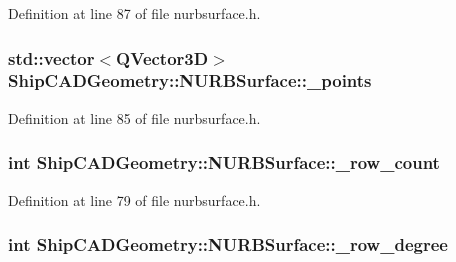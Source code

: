 Definition at line 87 of file nurbsurface.\-h.

\hypertarget{classShipCADGeometry_1_1NURBSurface_ae040c228e863bedf30c7e70a94a87c27}{
\subsubsection[{\-\_\-points}]{\setlength{\rightskip}{0pt plus 5cm}std\-::vector$<$Q\-Vector3\-D$>$ Ship\-C\-A\-D\-Geometry\-::\-N\-U\-R\-B\-Surface\-::\-\_\-points\hspace{0.3cm}{\ttfamily [protected]}}}\label{classShipCADGeometry_1_1NURBSurface_ae040c228e863bedf30c7e70a94a87c27}


Definition at line 85 of file nurbsurface.\-h.

\hypertarget{classShipCADGeometry_1_1NURBSurface_a88c1ca0b8176d2c0a758afa936d8eaba}{
\subsubsection[{\-\_\-row\-\_\-count}]{\setlength{\rightskip}{0pt plus 5cm}int Ship\-C\-A\-D\-Geometry\-::\-N\-U\-R\-B\-Surface\-::\-\_\-row\-\_\-count\hspace{0.3cm}{\ttfamily [protected]}}}\label{classShipCADGeometry_1_1NURBSurface_a88c1ca0b8176d2c0a758afa936d8eaba}


Definition at line 79 of file nurbsurface.\-h.

\hypertarget{classShipCADGeometry_1_1NURBSurface_a8de52ae5ee0129c669721597b0e98adf}{
\subsubsection[{\-\_\-row\-\_\-degree}]{\setlength{\rightskip}{0pt plus 5cm}int Ship\-C\-A\-D\-Geometry\-::\-N\-U\-R\-B\-Surface\-::\-\_\-row\-\_\-degree\hspace{0.3cm}{\ttfamily [protected]}}}\label{classShipCADGeometry_1_1NURBSurface_a8de52ae5ee0129c669721597b0e98adf}


